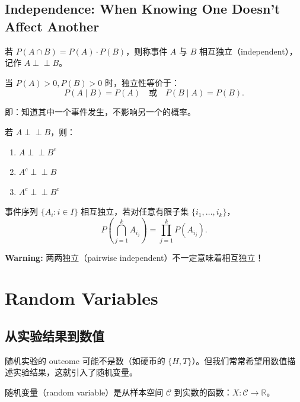 \subsection{Independence: When Knowing One Doesn't Affect Another}\label{sub:independence}

\begin{Definition}[独立性]\label{def:independence}
若 $P(A \cap B) = P(A) \cdot P(B)$，则称事件 $A$ 与 $B$ 相互独立（independent），记作 $A \perp\!\!\!\perp B$。
\end{Definition}

当 $P(A) > 0, P(B) > 0$ 时，独立性等价于：
\[
P(A \mid B) = P(A) \quad \text{或} \quad P(B \mid A) = P(B).
\]

即：知道其中一个事件发生，不影响另一个的概率。

\begin{Proposition}[独立的性质]\label{prop:independence-properties}
若 $A \perp\!\!\!\perp B$，则：
\begin{enumerate}
    \item $A \perp\!\!\!\perp B^c$
    \item $A^c \perp\!\!\!\perp B$
    \item $A^c \perp\!\!\!\perp B^c$
\end{enumerate}
\end{Proposition}

\begin{Definition}[相互独立]\label{def:mutual-independence}
事件序列 $\{A_i : i \in I\}$ 相互独立，若对任意有限子集 $\{i_1, \ldots, i_k\}$，
\[
P\left(\bigcap_{j=1}^{k} A_{i_j}\right) = \prod_{j=1}^{k} P(A_{i_j}).
\]
\end{Definition}

\textbf{Warning:} 两两独立（pairwise independent）不一定意味着相互独立！

\section{Random Variables}\label{sec:random-variables}

\subsection{从实验结果到数值}\label{sub:rv-intuition}

随机实验的 outcome 可能不是数（如硬币的 $\{H,T\}$）。但我们常常希望用数值描述实验结果，这就引入了随机变量。

\begin{Definition}[随机变量]\label{def:random-variable}
随机变量（random variable）是从样本空间 $\mathcal{C}$ 到实数的函数：$X: \mathcal{C} \to \mathbb{R}$。
\end{Definition}

